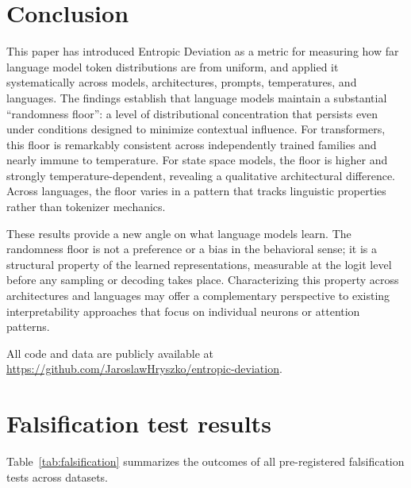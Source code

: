 \documentclass{article}
\begin{document}
\section{Conclusion}
\label{sec:conclusion}

This paper has introduced Entropic Deviation as a metric for measuring how far language model token distributions are from uniform, and applied it systematically across models, architectures, prompts, temperatures, and languages. The findings establish that language models maintain a substantial ``randomness floor'': a level of distributional concentration that persists even under conditions designed to minimize contextual influence. For transformers, this floor is remarkably consistent across independently trained families and nearly immune to temperature. For state space models, the floor is higher and strongly temperature-dependent, revealing a qualitative architectural difference. Across languages, the floor varies in a pattern that tracks linguistic properties rather than tokenizer mechanics.

These results provide a new angle on what language models learn. The randomness floor is not a preference or a bias in the behavioral sense; it is a structural property of the learned representations, measurable at the logit level before any sampling or decoding takes place. Characterizing this property across architectures and languages may offer a complementary perspective to existing interpretability approaches that focus on individual neurons or attention patterns.

All code and data are publicly available at \url{https://github.com/JaroslawHryszko/entropic-deviation}.




\appendix

\section{Falsification test results}
\label{app:falsification}

Table~\ref{tab:falsification} summarizes the outcomes of all pre-registered falsification tests across datasets.
\end{document}
